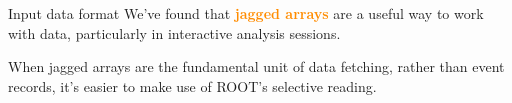 \documentclass[aspectratio=169]{beamer}
\begin{document}
\begin{frame}{Input data format}
\large
\vspace{0.5 cm}
We've found that \textcolor{darkorange}{\bf jagged arrays} are a useful way to work with data, particularly in interactive analysis sessions.

\vspace{0.5 cm}
When jagged arrays are the fundamental unit of data fetching, rather than event records, it's easier to make use of ROOT's selective reading.

\vspace{0.5 cm}



\end{frame}
\end{document}
